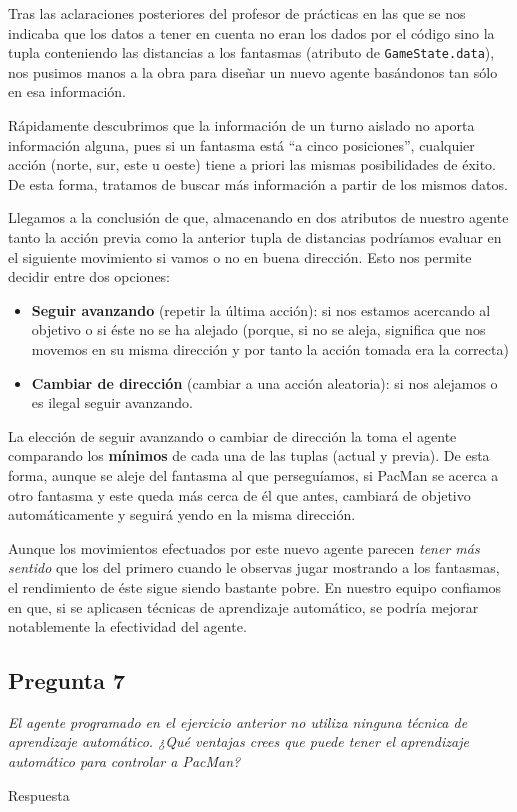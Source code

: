 \documentclass[12pt]{article}
\begin{document}
Tras las aclaraciones posteriores del profesor de prácticas en las que se nos
indicaba que los datos a tener en cuenta no eran los dados por el código sino
la tupla conteniendo las distancias a los fantasmas (atributo de
\texttt{GameState.data}), nos pusimos manos a la obra para diseñar un nuevo
agente basándonos tan sólo en esa información.

Rápidamente descubrimos que la información de un turno aislado no aporta
información alguna, pues si un fantasma está ``a cinco posiciones'', cualquier
acción (norte, sur, este u oeste) tiene a priori las mismas posibilidades de
éxito. De esta forma, tratamos de buscar más información a partir de los mismos
datos.

Llegamos a la conclusión de que, almacenando en dos atributos de nuestro agente
tanto la acción previa como la anterior tupla de distancias podríamos evaluar
en el siguiente movimiento si vamos o no en buena dirección. Esto nos permite
decidir entre dos opciones:

\begin{itemize}
    \item \textbf{Seguir avanzando} (repetir la última acción): si nos estamos
    acercando al objetivo o si éste no se ha alejado (porque, si no se aleja,
    significa que nos movemos en su misma dirección y por tanto la acción
    tomada era la correcta)
    \item \textbf{Cambiar de dirección} (cambiar a una acción aleatoria): si
    nos alejamos o es ilegal seguir avanzando.
\end{itemize}

La elección de seguir avanzando o cambiar de dirección la toma el agente
comparando los \textbf{mínimos} de cada una de las tuplas (actual y previa). De
esta forma, aunque se aleje del fantasma al que perseguíamos, si PacMan se
acerca a otro fantasma y este queda más cerca de él que antes, cambiará de
objetivo automáticamente y seguirá yendo en la misma dirección.

Aunque los movimientos efectuados por este nuevo agente parecen \emph{tener más
sentido} que los del primero cuando le observas jugar mostrando a los fantasmas,
el rendimiento de éste sigue siendo bastante pobre. En nuestro equipo confiamos
en que, si se aplicasen técnicas de aprendizaje automático, se podría mejorar
notablemente la efectividad del agente.

\newpage
\begin{center}
\subsection{Pregunta 7}

\emph{El agente programado en el ejercicio anterior no utiliza ninguna técnica
de aprendizaje automático. ¿Qué ventajas crees que puede tener el aprendizaje
automático para controlar a PacMan?}
\end{center}
Respuesta
\end{document}
